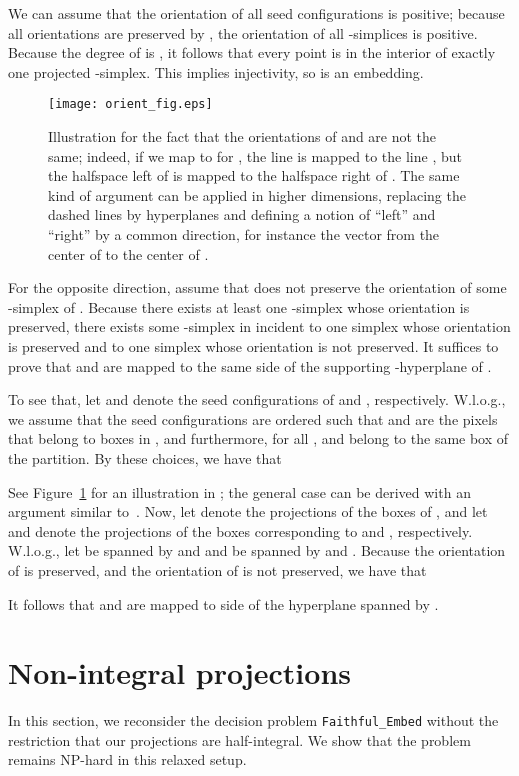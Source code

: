 \documentclass[12pt]{article}
\begin{document}
\begin{appendix}
We can assume that the orientation of all seed configurations is positive; because
all orientations are preserved by ,
the orientation of all -simplices is positive. Because the degree of  is , it
follows that every point is in the interior of exactly one projected -simplex. This implies injectivity, 
so  is an embedding.

\begin{figure}[htb]
\centering
\texttt{[image: orient\_fig.eps]}
\caption{Illustration for the fact that the orientations of  and 
         are not the same; indeed, if we map  to  for , the line 
         is mapped to the line , but the halfspace left of  is mapped to
         the halfspace right of . The same kind of argument can be applied
         in higher dimensions, replacing the dashed lines by hyperplanes and defining a notion
         of ``left'' and ``right'' by a common direction, for instance the vector from
         the center of  to the center of .}
\label{fig:orient_fig}
\end{figure}


For the opposite direction, assume that  does not preserve the orientation 
of some -simplex of . Because there exists at least one -simplex
whose orientation is preserved, there exists some -simplex  in 
incident to one simplex  whose orientation is preserved and to one 
simplex  whose orientation is not preserved.
It suffices to prove that  and  are mapped to the same side
of the supporting -hyperplane of .

To see that, let  and  denote the seed configurations of 
and , respectively. W.l.o.g., we assume that the seed configurations are ordered such that
 and  are the pixels that belong to boxes in , and
furthermore, for all ,  and  belong to the same box of the partition.
By these choices, we have that

See Figure~\ref{fig:orient_fig} for an illustration in ; 
the general case can be derived with an argument similar to~\cite[p.167]{ah-topologie}.
Now, let  denote the projections of the boxes of , and let  and 
denote the projections of the boxes corresponding to  and , respectively.
W.l.o.g., let  be spanned by  and  and  be spanned
by  and . Because the orientation of  is preserved, and the orientation
of  is not preserved, we have that

It follows that  and  are mapped to side of the hyperplane spanned by .

\section{Non-integral projections}\label{app:non-half-integral}
In this section, we reconsider the decision problem \texttt{Faithful\_Embed}
without the restriction that our projections are half-integral.
We show that the problem remains NP-hard in this relaxed setup.


\end{appendix}
\end{document}
